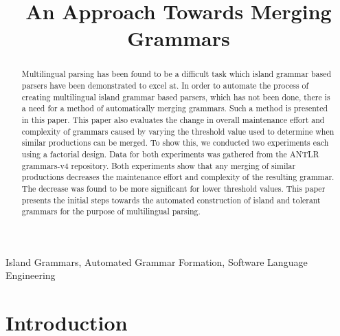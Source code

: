 \documentclass[conference]{IEEEtran}
\begin{document}
\title{An Approach Towards Merging Grammars}

\author{%
  }

\maketitle

\begin{abstract}
Multilingual parsing has been found to be a difficult task which island
grammar based parsers have been demonstrated to excel at. In order to
automate the process of creating multilingual island grammar based
parsers, which has not been done, there is a need for a method of
automatically merging grammars. Such a method is presented in this
paper. This paper also evaluates the change in overall maintenance
effort and complexity of grammars caused by varying the threshold value
used to determine when similar productions can be merged. To show this,
we conducted two experiments each using a factorial design. Data for
both experiments was gathered from the ANTLR grammars-v4 repository.
Both experiments show that any merging of similar productions decreases
the maintenance effort and complexity of the resulting grammar. The
decrease was found to be more significant for lower threshold values.
This paper presents the initial steps towards the automated construction
of island and tolerant grammars for the purpose of multilingual parsing.
\end{abstract}

\begin{IEEEkeywords}
Island Grammars, Automated Grammar Formation, Software Language
Engineering
\end{IEEEkeywords}

\setlength{\grammarparsep}{1pt}


\hypertarget{sec:introduction}{%
\section{Introduction}\label{sec:introduction}}
\end{document}
